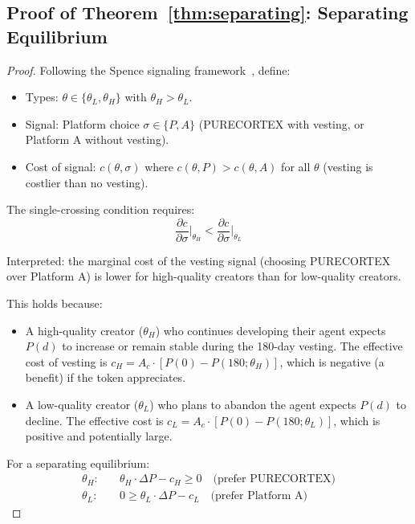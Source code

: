 \subsection{Proof of Theorem~\ref{thm:separating}: Separating Equilibrium}

\begin{proof}
Following the Spence signaling framework~\citep{spence1973job}, define:
\begin{itemize}
  \item Types: $\theta \in \{\theta_L, \theta_H\}$ with $\theta_H > \theta_L$.
  \item Signal: Platform choice $\sigma \in \{P, A\}$ (PURECORTEX with vesting,
    or Platform A without vesting).
  \item Cost of signal: $c(\theta, \sigma)$ where $c(\theta, P) > c(\theta, A)$
    for all $\theta$ (vesting is costlier than no vesting).
\end{itemize}

The single-crossing condition requires:
\begin{equation}
  \frac{\partial c}{\partial \sigma}\bigg|_{\theta_H} < \frac{\partial c}{\partial \sigma}\bigg|_{\theta_L}
\end{equation}

Interpreted: the marginal cost of the vesting signal (choosing PURECORTEX over
Platform A) is lower for high-quality creators than for low-quality creators.

This holds because:
\begin{itemize}
  \item A high-quality creator ($\theta_H$) who continues developing their
    agent expects $P(d)$ to increase or remain stable during the 180-day
    vesting. The effective cost of vesting is $c_H = A_c \cdot [P(0) - P(180; \theta_H)]$, which is negative (a benefit) if the token appreciates.
  \item A low-quality creator ($\theta_L$) who plans to abandon the agent
    expects $P(d)$ to decline. The effective cost is $c_L = A_c \cdot [P(0) - P(180; \theta_L)]$, which is positive and potentially large.
\end{itemize}

For a separating equilibrium:
\begin{align}
  \theta_H: &\quad \theta_H \cdot \Delta P - c_H \geq 0 \quad \text{(prefer PURECORTEX)} \\
  \theta_L: &\quad 0 \geq \theta_L \cdot \Delta P - c_L \quad \text{(prefer Platform A)}
\end{align}


\end{proof}
